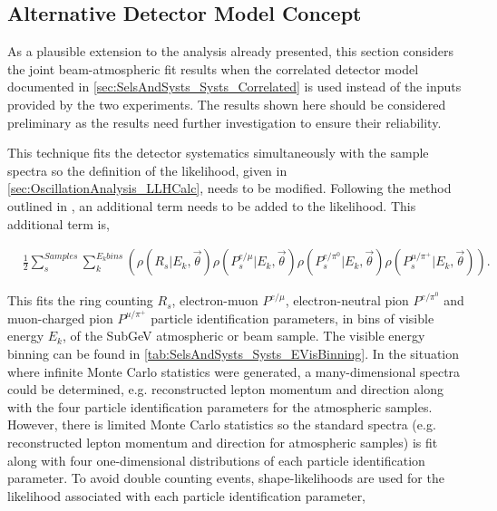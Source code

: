 \clearpage
\subsection{Alternative Detector Model Concept}
\label{sec:AlternativeDetectorModel}

As a plausible extension to the analysis already presented, this section considers the joint beam-atmospheric fit results when the correlated detector model documented in \autoref{sec:SelsAndSysts_Systs_Correlated} is used instead of the inputs provided by the two experiments. The results shown here should be considered preliminary as the results need further investigation to ensure their reliability.

This technique fits the detector systematics simultaneously with the sample spectra so the definition of the likelihood, given in \autoref{sec:OscillationAnalysis_LLHCalc}, needs to be modified. Following the method outlined in , an additional term needs to be added to the likelihood. This additional term is,

\begin{equation}
  \label{eqn:Likelihood:Likelihood_CorrelatedDetectorModel}
  \begin{split}
    & \frac{1}{2} \sum^{Samples}_s \sum^{E_{k} bins}_{k} \left(\rho(R_s | E_k, \vec{\theta}) \rho(P^{e/\mu}_s | E_k, \vec{\theta}) \rho(P^{e/\pi^0}_s | E_k, \vec{\theta}) \rho(P^{\mu/\pi^+}_s | E_k, \vec{\theta}) \right).
  \end{split}
\end{equation}

This fits the ring counting $R_s$, electron-muon $P^{e/\mu}$, electron-neutral pion $P^{e/\pi^0}$ and muon-charged pion $P^{\mu/\pi^+}$ particle identification parameters, in bins of visible energy $E_k$, of the  SubGeV atmospheric or beam sample. The visible energy binning can be found in \autoref{tab:SelsAndSysts_Systs_EVisBinning}. In the situation where infinite Monte Carlo statistics were generated, a many-dimensional spectra could be determined, e.g. reconstructed lepton momentum and direction along with the four particle identification parameters for the atmospheric samples. However, there is limited Monte Carlo statistics so the standard spectra (e.g. reconstructed lepton momentum and direction for atmospheric samples) is fit along with four one-dimensional distributions of each particle identification parameter. To avoid double counting events, shape-likelihoods are used for the likelihood associated with each particle identification parameter,

